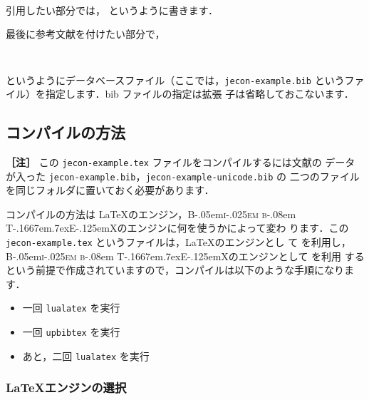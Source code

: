 \documentclass[article]{jlreq}
\newcommand{\BibTeX}{\textrm{B\kern-.05em\textsc{i\kern-.025em b}\kern-.08em%
T\kern-.1667em\lower.7ex\hbox{E}\kern-.125emX}}
\newcommand{\midashii}[1]{\noindent \textbf{［#1］}}
\begin{document}
\begin{screen}
\begin{verbatim}
 
\end{verbatim}
\end{screen}

引用したい部分では，
というように書きます．

最後に参考文献を付けたい部分で，
\begin{screen}
\begin{verbatim}
 
\end{verbatim}
\end{screen}
というようにデータベースファイル（ここでは，\texttt{jecon-example.bib} というファ
イル）を指定します．bib ファイルの指定は拡張
子は省略しておこないます．

\subsection{コンパイルの方法}

\midashii{注} この \texttt{jecon-example.tex} ファイルをコンパイルするには文献の
データが入った \texttt{jecon-example.bib}，\texttt{jecon-example-unicode.bib} の
二つのファイルを同じフォルダに置いておく必要があります．

\vspace*{2em}



コンパイルの方法は \LaTeX のエンジン，\BibTeX のエンジンに何を使うかによって変わ
ります．この \texttt{jecon-example.tex} というファイルは，\LaTeX のエンジンとし
て \LuaLaTeX を利用し，\BibTeX のエンジンとして \upBibTeX を利用
するという前提で作成されていますので，コンパイルは以下のような手順になります．
\begin{itemize}
 \item 一回 \texttt{lualatex} を実行
 \item 一回 \texttt{upbibtex} を実行
 \item あと，二回 \texttt{lualatex} を実行
\end{itemize}


\subsubsection{\LaTeX エンジンの選択}
\end{document}
